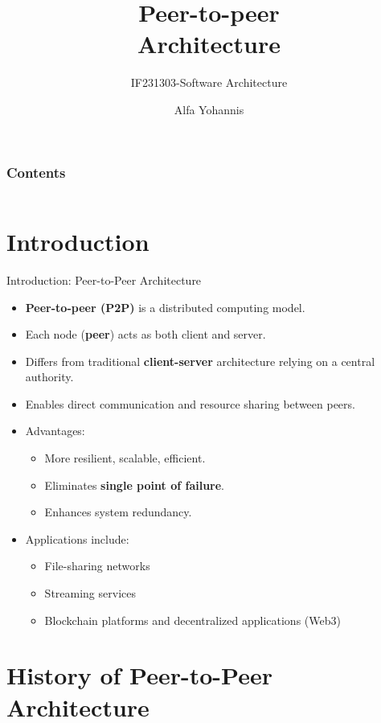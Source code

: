 \documentclass[aspectratio=169, table]{beamer}
\title{\Huge Peer-to-peer\\Architecture\\\vspace{10pt}}
\subtitle{IF231303-Software Architecture}
\author{Alfa Yohannis}
\begin{document}
\frame{\titlepage}

\begin{frame}[fragile]
\frametitle{Contents}
\vspace{10pt}
\begin{columns}[t]
\tableofcontents[sections={1-4}]

\tableofcontents[sections={5-10}]
\end{columns}
\end{frame}


\section{Introduction}

\begin{frame}{Introduction: Peer-to-Peer Architecture}
	\vspace{20pt}
	\begin{itemize}
		\item \textbf{Peer-to-peer (P2P)} is a distributed computing model.
		\item Each node (\textbf{peer}) acts as both client and server.
		\item Differs from traditional \textbf{client-server} architecture relying on a central authority.
		\item Enables direct communication and resource sharing between peers.
		\item Advantages:
		\begin{itemize}
			\item More resilient, scalable, efficient.
			\item Eliminates \textbf{single point of failure}.
			\item Enhances system redundancy.
		\end{itemize}
		\item Applications include:
		\begin{itemize}
			\item File-sharing networks
			\item Streaming services
			\item Blockchain platforms and decentralized applications (Web3)
		\end{itemize}
	\end{itemize}
\end{frame}

\section{History of Peer-to-Peer Architecture}
\end{document}

